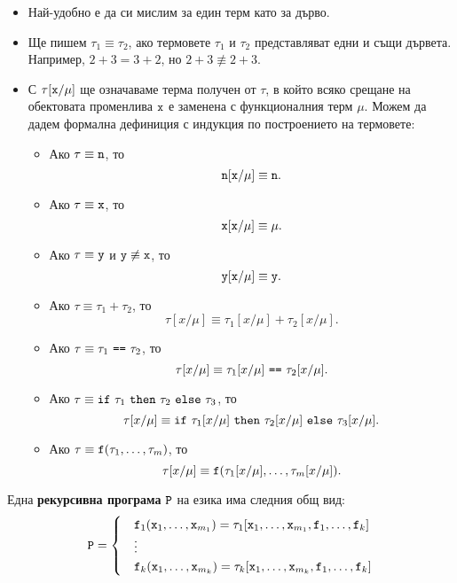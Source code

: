 \begin{itemize}
\item
  Най-удобно е да си мислим за един терм като за дърво.
\item
  Ще пишем $\tau_1 \equiv \tau_2$, ако термовете $\tau_1$ и $\tau_2$ представляват едни и същи дървета.
  Например, $2+3 = 3+2$, но $2+3 \not\equiv 2+3$.
\item
  С $\tau[\texttt{x}/\mu]$ ще означаваме терма получен от $\tau$, в който всяко срещане на обектовата променлива $\texttt{x}$
  е заменена с функционалния терм $\mu$. Можем да дадем формална дефиниция с индукция по построението на термовете:
  \begin{itemize}
  \item
    Ако $\tau \equiv \texttt{n}$, то
    \[\texttt{n}[\texttt{x}/\mu] \equiv \texttt{n}.\]
  \item
    Ако $\tau \equiv \texttt{x}$, то
    \[\texttt{x}[\texttt{x}/\mu] \equiv \mu.\]
  \item
    Ако $\tau \equiv \texttt{y}$ и $\texttt{y} \not\equiv \texttt{x}$, то
    \[\texttt{y}[\texttt{x}/\mu] \equiv \texttt{y}.\]
  \item
    Ако $\tau \equiv \tau_1 + \tau_2$, то
    \[\tau[x/\mu] \equiv \tau_1[x/\mu] + \tau_2[x/\mu].\]
  \item
    Ако $\tau \equiv \tau_1\ \vv{==}\ \tau_2$, то
    \[\tau[x/\mu] \equiv \tau_1[x/\mu]\ \texttt{==}\ \tau_2[x/\mu].\]
  \item
    Ако $\tau \equiv \texttt{if}\ \tau_1\ \texttt{then}\ \tau_2\ \texttt{else}\ \tau_3$, то
    \[\tau[x/\mu] \equiv \texttt{if}\ \tau_1[x/\mu]\ \texttt{then}\ \tau_2[x/\mu]\ \texttt{else}\ \tau_3[x/\mu].\]
  \item
    Ако $\tau \equiv \texttt{f}(\tau_1,\dots,\tau_m)$, то
    \[\tau[x/\mu] \equiv \texttt{f}(\tau_1[x/\mu], \dots, \tau_m[x/\mu]).\]
  \end{itemize}  
\end{itemize}


Една {\bf рекурсивна програма} $\texttt{P}$ на езика \REC има следния общ вид:
\begin{align*}
  \texttt{P} = 
  \begin{cases}
    & \texttt{f}_1(\texttt{x}_1,\dots,\texttt{x}_{m_1}) = \tau_1[\texttt{x}_1,\dots,\texttt{x}_{m_1},\texttt{f}_1,\dots,\texttt{f}_k]\\
    & \vdots\\
    & \texttt{f}_k(\texttt{x}_1,\dots,\texttt{x}_{m_k}) = \tau_k[\texttt{x}_1,\dots,\texttt{x}_{m_k},\texttt{f}_1,\dots,\texttt{f}_k]
  \end{cases}
\end{align*}


